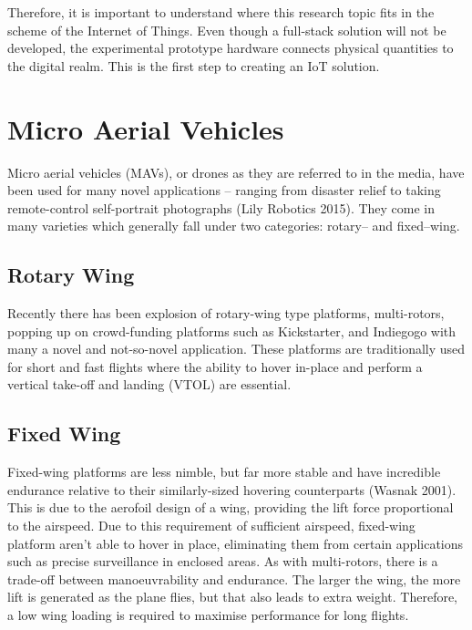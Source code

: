 Therefore, it is important to understand where this research topic fits in the scheme of the Internet of Things. Even though a full-stack solution will not be developed, the experimental prototype hardware connects physical quantities to the digital realm. This is the first step to creating an IoT solution.


\section{Micro Aerial Vehicles}

Micro aerial vehicles (MAVs), or drones as they are referred to in the media, have been used for many novel applications – ranging from disaster relief to taking remote-control self-portrait photographs (Lily Robotics 2015). They come in many varieties which generally fall under two categories: rotary– and fixed–wing.


\subsection{Rotary Wing}

Recently there has been explosion of rotary-wing type platforms, multi-rotors, popping up on crowd-funding platforms such as Kickstarter, and Indiegogo with many a novel and not-so-novel application. These platforms are traditionally used for short and fast flights where the ability to hover in-place and perform a vertical take-off and landing (VTOL) are essential.


\subsection{Fixed Wing}

Fixed-wing platforms are less nimble, but far more stable and have incredible endurance relative to their similarly-sized hovering counterparts (Wasnak 2001). This is due to the aerofoil design of a wing, providing the lift force proportional to the airspeed. Due to this requirement of sufficient airspeed, fixed-wing platform aren’t able to hover in place, eliminating them from certain applications such as precise surveillance in enclosed areas. As with multi-rotors, there is a trade-off between manoeuvrability and endurance. The larger the wing, the more lift is generated as the plane flies, but that also leads to extra weight. Therefore, a low wing loading is required to maximise performance for long flights.


